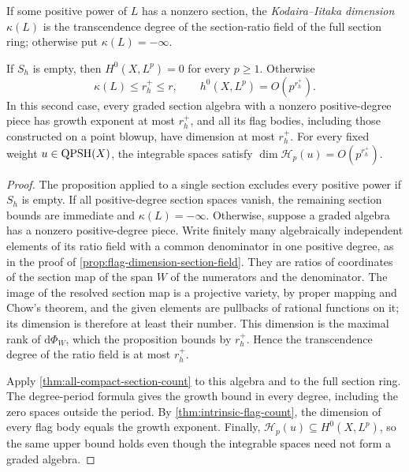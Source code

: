 If some positive power of $L$ has a nonzero section, the \emph{Kodaira--Iitaka dimension} $\kappa(L)$ is the transcendence degree of the section-ratio field of the full section ring; otherwise put $\kappa(L)=-\infty$.

\begin{corollary}\label{cor:curvature-rank-section-count}
If $S_h$ is empty, then $H^0(X,L^p)=0$ for every $p\geq1$. Otherwise
\[
 \kappa(L)\leq r_h^+\leq r,
 \qquad h^0(X,L^p)=O(p^{r_h^+}).
\]
In this second case, every graded section algebra with a nonzero positive-degree piece has growth exponent at most $r_h^+$, and all its flag bodies, including those constructed on a point blowup, have dimension at most $r_h^+$. For every fixed weight $u\in\mathrm{QPSH}(X)$, the integrable spaces satisfy $\dim\mathcal H_p(u)=O(p^{r_h^+})$.
\end{corollary}
\begin{proof}
The proposition applied to a single section excludes every positive power if $S_h$ is empty. If all positive-degree section spaces vanish, the remaining section bounds are immediate and $\kappa(L)=-\infty$. Otherwise, suppose a graded algebra has a nonzero positive-degree piece. Write finitely many algebraically independent elements of its ratio field with a common denominator in one positive degree, as in the proof of \cref{prop:flag-dimension-section-field}. They are ratios of coordinates of the section map of the span $W$ of the numerators and the denominator. The image of the resolved section map is a projective variety, by proper mapping and Chow's theorem, and the given elements are pullbacks of rational functions on it; its dimension is therefore at least their number. This dimension is the maximal rank of $\mathrm d\Phi_W$, which the proposition bounds by $r_h^+$. Hence the transcendence degree of the ratio field is at most $r_h^+$.

Apply \cref{thm:all-compact-section-count} to this algebra and to the full section ring. The degree-period formula gives the growth bound in every degree, including the zero spaces outside the period. By \cref{thm:intrinsic-flag-count}, the dimension of every flag body equals the growth exponent. Finally, $\mathcal H_p(u)\subseteq H^0(X,L^p)$, so the same upper bound holds even though the integrable spaces need not form a graded algebra.
\end{proof}

